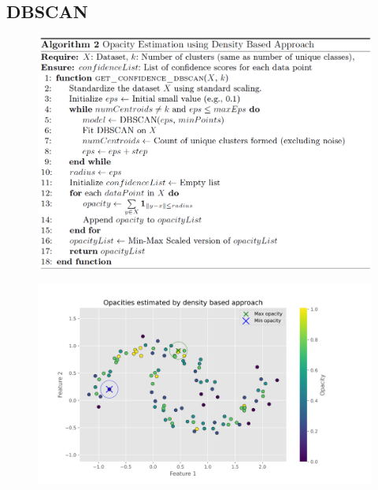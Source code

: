 \documentclass[aspectratio=169]{beamer}
\begin{document}
\subsection{{\rm DBSCAN}}
\begin{frame}
\begin{figure}
    \centering
    \includegraphics[width=0.75\linewidth]{alg_dbscan_opacity.png}
    \label{fig:enter-label}
\end{figure}
    
\end{frame}


\begin{frame}
\begin{figure}
    \centering
    \includegraphics[width=0.75\linewidth]{denisty_opactiy.png}
    \label{fig:enter-label}
\end{figure}
\end{frame}
\end{document}
